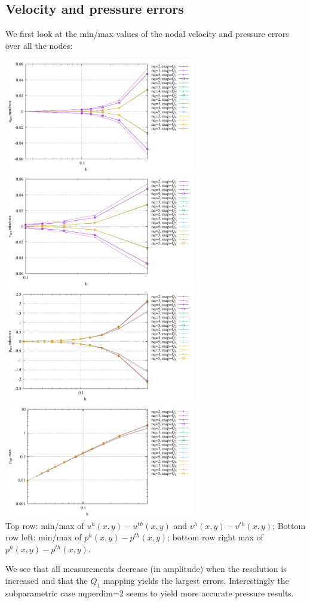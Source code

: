 \subsection*{Velocity and pressure errors}

We first look at the min/max values of the nodal velocity and pressure errors over all the nodes:
\begin{center}
\includegraphics[width=8.3cm]{python_codes/fieldstone_152/results/exp0/u_err}
\includegraphics[width=8.3cm]{python_codes/fieldstone_152/results/exp0/v_err}\\
\includegraphics[width=8.3cm]{python_codes/fieldstone_152/results/exp0/p_err}
\includegraphics[width=8.3cm]{python_codes/fieldstone_152/results/exp0/p_err_max}\\
{\captionfont Top row: min/max of $u^h(x,y)-u^{th}(x,y)$ and $v^h(x,y)-v^{th}(x,y)$;
Bottom row left: min/max of $p^h(x,y)-p^{th}(x,y)$; bottom row right max of  $p^h(x,y)-p^{th}(x,y)$.} 
\end{center}
We see that all measurements decrease (in amplitude) when the resolution is increased and that 
the $Q_1$ mapping yields the largest errors. 
Interestingly the subparametric case {\python nqperdim=2} seems to yield more accurate 
pressure results.

